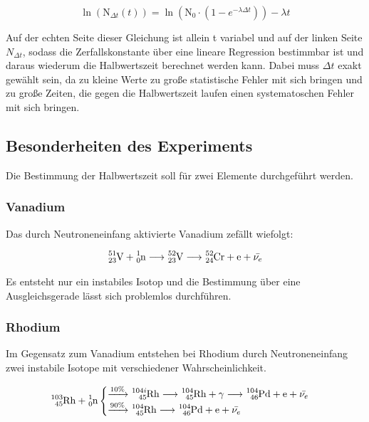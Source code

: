 \documentclass[titlepage = firstcover]{scrartcl}
\begin{document}
            \begin{equation}
                \ln\left(\text{N}_{\Delta t}(t)\right) = \ln \left(\text{N}_0 \cdot \left(1 - e^{-\lambda \Delta t}\right)\right) - \lambda t
            \end{equation}
            
            \noindent
            Auf der echten Seite dieser Gleichung ist allein t variabel und auf der linken Seite $N_{\Delta t}$, sodass die Zerfallskonstante über eine lineare Regression bestimmbar ist und daraus 
            wiederum die Halbwertszeit berechnet werden kann. Dabei muss
            $\Delta t$ exakt gewählt sein, da zu kleine Werte zu große statistische Fehler mit sich bringen und zu große Zeiten, die gegen die Halbwertszeit laufen einen systematoschen Fehler mit
            sich bringen.

        \subsection{Besonderheiten des Experiments}
            Die Bestimmung der Halbwertszeit soll für zwei Elemente durchgeführt werden.

                \subsubsection*{Vanadium}
                Das durch Neutroneneinfang aktivierte Vanadium zefällt wiefolgt:

                \begin{equation*}
                    \ce{^{51}_{23}V} + \ce{^{1}_{0}n} \longrightarrow \ce{^{52}_{23}V}  \longrightarrow \ce{^{52}_{24}Cr} + \text{e} + \bar{\nu_e}
                \end{equation*}

                \noindent 
                Es entsteht nur ein instabiles Isotop und die Bestimmung über eine Ausgleichsgerade lässt sich problemlos durchführen.
                
                \subsubsection*{Rhodium}
                Im Gegensatz zum Vanadium entstehen bei Rhodium durch Neutroneneinfang zwei instabile Isotope mit verschiedener Wahrscheinlichkeit.

                \begin{equation*}
                    \ce{^{103}_{45}Rh} + \ce{^{1}_{0}n}  \begin{cases}
                        \xrightarrow{10\%} \ce{^{104i}_{45}Rh} \longrightarrow \ce{^{104}_{45}Rh} + \gamma \longrightarrow \ce{^{104}_{46}Pd} + \text{e} + \bar{\nu_e} \\
                        \xrightarrow{90\%} \ce{^{104}_{45}Rh} \longrightarrow \ce{^{104}_{46}Pd} + \text{e} + \bar{\nu_e}
                    \end{cases}
                \end{equation*}
\end{document}
